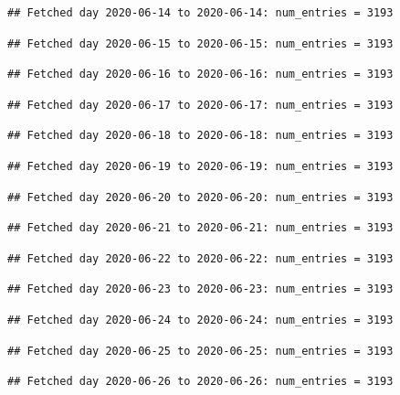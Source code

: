 \documentclass[]{article}
\begin{document}
\begin{verbatim}
## Fetched day 2020-06-14 to 2020-06-14: num_entries = 3193
\end{verbatim}

\begin{verbatim}
## Fetched day 2020-06-15 to 2020-06-15: num_entries = 3193
\end{verbatim}

\begin{verbatim}
## Fetched day 2020-06-16 to 2020-06-16: num_entries = 3193
\end{verbatim}

\begin{verbatim}
## Fetched day 2020-06-17 to 2020-06-17: num_entries = 3193
\end{verbatim}

\begin{verbatim}
## Fetched day 2020-06-18 to 2020-06-18: num_entries = 3193
\end{verbatim}

\begin{verbatim}
## Fetched day 2020-06-19 to 2020-06-19: num_entries = 3193
\end{verbatim}

\begin{verbatim}
## Fetched day 2020-06-20 to 2020-06-20: num_entries = 3193
\end{verbatim}

\begin{verbatim}
## Fetched day 2020-06-21 to 2020-06-21: num_entries = 3193
\end{verbatim}

\begin{verbatim}
## Fetched day 2020-06-22 to 2020-06-22: num_entries = 3193
\end{verbatim}

\begin{verbatim}
## Fetched day 2020-06-23 to 2020-06-23: num_entries = 3193
\end{verbatim}

\begin{verbatim}
## Fetched day 2020-06-24 to 2020-06-24: num_entries = 3193
\end{verbatim}

\begin{verbatim}
## Fetched day 2020-06-25 to 2020-06-25: num_entries = 3193
\end{verbatim}

\begin{verbatim}
## Fetched day 2020-06-26 to 2020-06-26: num_entries = 3193
\end{verbatim}
\end{document}
